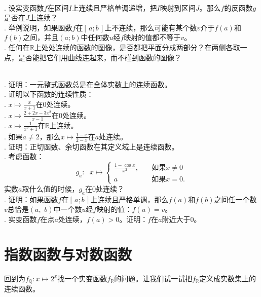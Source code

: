 \documentclass[12pt,UTF8]{ctexbook}
\begin{document}
\begin{sk}
    \mbox{} \\
    . 设实变函数$f$在区间$I$上连续且严格单调递增，把$I$映射到区间$J$。那么$f$的反函数$g$是否在$J$上连续？\\
    . 举例说明，如果函数$f$在$[\,a;b\,]$上不连续，那么可能有某个数$v$介于$f(a)$和$f(b)$之间，并且$(a;b)$中任何数$u$经$f$映射的值都不等于$v$。\\
    . 任何在$\mathbb{R}$上处处连续的函数的图像，是否都把平面分成两部分？在两侧各取一点，是否能把它们用曲线连起来，而不碰到函数的图像？
\end{sk}

\begin{xt}
    \mbox{} \\
    . 证明：一元整式函数总是在全体实数上的连续函数。\\
    . 证明以下函数的连续性质：\\
    . $x\mapsto \displaystyle\frac{x}{x + 1}$在$0$处连续。\\
    . $x\mapsto \displaystyle\frac{2 + 2x - 3x^2}{x - 1}$在$0$处连续。\\
    . $x\mapsto \displaystyle\frac{1}{x^2 + 1}$在$\mathbb{R}$上连续。\\
    . 如果$a\neq 2$，那么$x\mapsto \displaystyle\frac{1 - x}{2 - x}$在$a$处连续。\\
    . 证明：正切函数、余切函数在其定义域上是连续函数。\\
    . 考虑函数：
    $$
        g_a: \;\,\,x \mapsto \left\{ \begin{array}{cc}
            \displaystyle\frac{1 - \cos{x}}{x^2},&\quad \mbox{如果}x\neq 0 \\
            a &\quad \mbox{如果}x = 0. 
        \end{array}\right.
    $$
    实数$a$取什么值的时候，$g_a$在$0$处连续？\\
    . 证明：如果函数$f$在$[\,a;b\,]$上连续且严格单调，那么$f(a)$和$f(b)$之间任一个数$v$总恰是$(a, \,\,b)$中一个数$u$经$f$映射的值：$f(u) = v$。\\
    . 实变函数$f$在点$a$处连续，$f(a)>0$。证明：$f$在$a$附近大于$0$。
\end{xt}

\section{指数函数与对数函数}
回到为$f_{\mathbb{Q}}: x\mapsto 2^x$找一个实变函数$f_{\mathbb{R}}$的问题。让我们试一试把$f_{\mathbb{R}}$定义成实数集上的连续函数。
\end{document}
